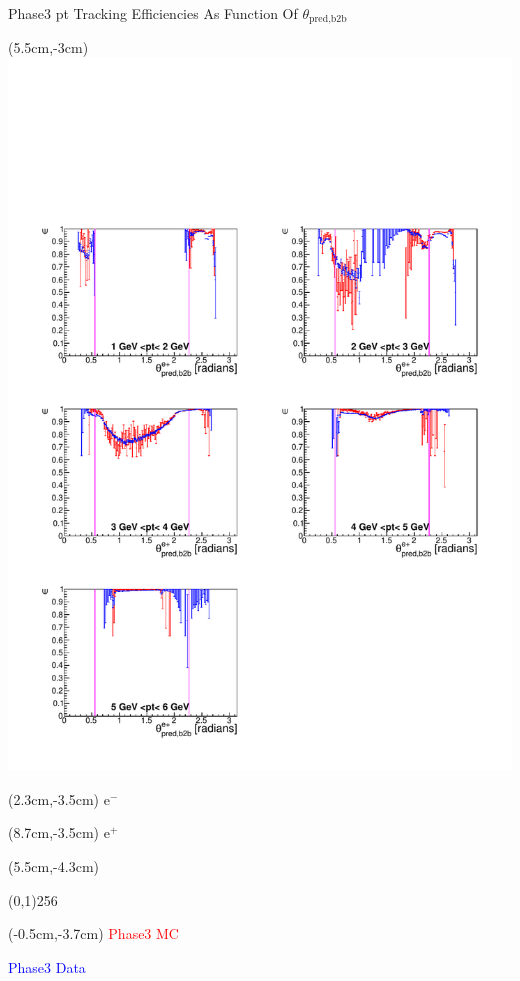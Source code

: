 \documentclass[8pt]{beamer}
\begin{document}
\begin{frame}{Phase3 pt Tracking Efficiencies As Function Of $\theta_{\textrm{pred,b2b}}$}
	\begin{textblock*}{6.5cm}(5.5cm,-3cm)
		\includegraphics[width=\textwidth]{VPlots/P3/xPtMThetaepP3}
	\end{textblock*}
	
	
	\begin{textblock*}{2cm}(2.3cm,-3.5cm)
		$\textrm{e}^-$
	\end{textblock*}
	
	\begin{textblock*}{2cm}(8.7cm,-3.5cm)
		$\textrm{e}^+$
	\end{textblock*}
	
	
	
	\begin{textblock*}{11cm}(5.5cm,-4.3cm)
		
		\begin{center}
			\line(0,1){256}
		\end{center}
		
	\end{textblock*}
	
	\begin{textblock*}{4cm}(-0.5cm,-3.7cm)
		\textcolor{red}{Phase3 MC}
		
		\textcolor{blue}{Phase3 Data}
	\end{textblock*}
	




\end{frame}
\end{document}
